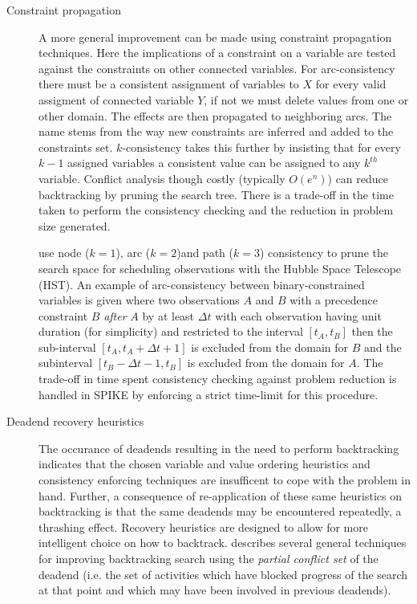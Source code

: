 \begin{description}
\item[Constraint propagation]
A more general improvement can be made using constraint propagation techniques. Here the implications of a constraint on a variable are tested against the constraints on other connected variables. For arc-consistency there must be a consistent assignment of variables to $X$ for every valid assigment of connected variable $Y$, if not we must delete values from one or other domain. The effects are then propagated to neighboring arcs. The name stems from the way new constraints are inferred and added to the constraints set. $k$-consistency takes this further by insisting that for every $k-1$ assigned variables a consistent value can be assigned to any $k^{th}$ variable. Conflict analysis though costly (typically $O(e^n)$) \citep{bitner75backtrack} can reduce backtracking by pruning the search tree. There is a trade-off in the time taken to perform the consistency checking and the reduction in problem size generated.

\citet{johnston94spike} use node ($k=1$), arc ($k=2$)and path ($k=3$) consistency to prune the search space for scheduling observations with the Hubble Space Telescope (HST). An example of arc-consistency between binary-constrained variables is given where two observations $A$ and $B$ with a precedence constraint $B$ \emph{after} $A$ by at least $\Delta t$ with each observation having unit duration (for simplicity) and restricted to the interval $[t_A,t_B]$ then the sub-interval $[t_A,t_A+ \Delta t+1]$ is excluded from the domain for $B$ and the subinterval $[t_B-\Delta t-1,t_B]$ is excluded from the domain for $A$. The trade-off in time spent consistency checking against problem reduction is handled in SPIKE by enforcing a strict time-limit for this procedure.

\item[Deadend recovery heuristics] 
The occurance of deadends resulting in the need to perform backtracking indicates that the chosen variable and value ordering heuristics and consistency enforcing techniques are insufficent to cope with the problem in hand. Further, a consequence of re-application of these same heuristics on backtracking is that the same deadends may be encountered repeatedly, a thrashing effect. Recovery heuristics are designed to allow for more intelligent choice on how to backtrack. \citet{sadeh94backtracking} describes several general techniques for improving backtracking search using the \emph{partial conflict set} of the deadend (i.e. the set of activities which have blocked progress of the search at that point and which may have been involved in previous deadends).


\end{description}
